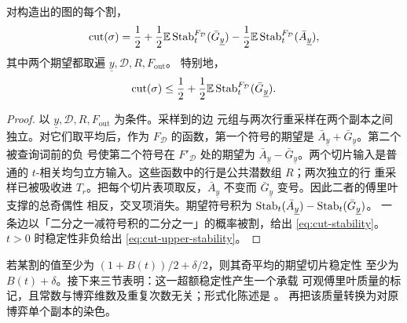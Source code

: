 \begin{lemma}[稳定性恒等式]\label{lem:cut-stability}
对构造出的图的每个割，
\begin{equation}\label{eq:cut-stability}
 \operatorname{cut}(\sigma)=\frac12+
 \frac12\mathbb E\operatorname{Stab}_t^{F_{\mathcal D}}(\bar G_{\underline y})
 -\frac12\mathbb E\operatorname{Stab}_t^{F_{\mathcal D}}(\bar A_{\underline y}),
\end{equation}
其中两个期望都取遍 $\underline y,\mathcal D,R,F_{\mathrm{out}}$。
特别地，
\begin{equation}\label{eq:cut-upper-stability}
 \operatorname{cut}(\sigma)\le\frac12+
 \frac12\mathbb E\operatorname{Stab}_t^{F_{\mathcal D}}(\bar G_{\underline y}).
\end{equation}
\end{lemma}

\begin{proof}
以 $\underline y,\mathcal D,R,F_{\mathrm{out}}$ 为条件。采样到的边
元组与两次行重采样在两个副本之间独立。对它们取平均后，作为
$F_{\mathcal D}$ 的函数，第一个符号的期望是
$\bar A_{\underline y}+\bar G_{\underline y}$。第二个被查询词前的负
号使第二个符号在 $F'_{\mathcal D}$ 处的期望为
$\bar A_{\underline y}-\bar G_{\underline y}$。两个切片输入是普通的
$t$-相关均匀立方输入。这些函数中的行是公共潜数组 $R$；两次独立的行
重采样已被吸收进 $T_r$。把每个切片表项取反，$\bar A_{\underline y}$
不变而 $\bar G_{\underline y}$ 变号。因此二者的傅里叶支撑的总奇偶性
相反，交叉项消失。期望符号积为
$\operatorname{Stab}_t(\bar A_{\underline y})-\operatorname{Stab}_t(\bar G_{\underline y})$。
一条边以「二分之一减符号积的二分之一」的概率被割，给出
\eqref{eq:cut-stability}。$t>0$ 时稳定性非负给出
\eqref{eq:cut-upper-stability}。
\end{proof}

若某割的值至少为 $(1+B(t))/2+\delta/2$，则其奇平均的期望切片稳定性
至少为 $B(t)+\delta$。接下来三节表明：这一超额稳定性产生一个承载
可观傅里叶质量的标记，且常数与博弈维数及重复次数无关；形式化陈述是
。 再把该质量转换为对原
博弈单个副本的染色。
